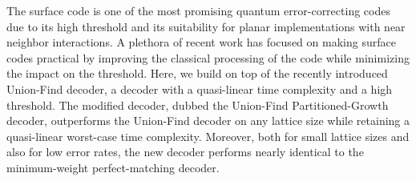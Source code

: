 The surface code is one of the most promising quantum error-correcting codes due to its high threshold and its suitability for planar implementations with near neighbor interactions. A plethora of recent work has focused on making surface codes practical by improving the classical processing of the code while minimizing the impact on the threshold. Here, we build on top of the recently introduced Union-Find decoder, a decoder with a quasi-linear time complexity and a high threshold. The modified decoder, dubbed the Union-Find Partitioned-Growth decoder, outperforms the Union-Find decoder on any lattice size while retaining a quasi-linear worst-case time complexity. Moreover, both for small lattice sizes and also for low error rates, the new decoder performs nearly identical to the minimum-weight perfect-matching decoder.

